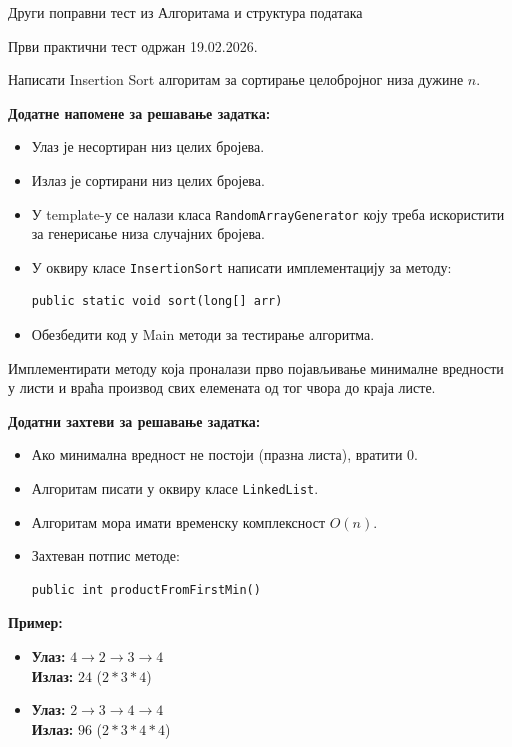 
Други поправни тест из Алгоритама и структура података

Први практични тест одржан 19.02.2026.

Написати Insertion Sort алгоритам за сортирање целобројног низа дужине $n$.

\textbf{Додатне напомене за решавање задатка:}
\begin{itemize}
	\item Улаз је несортиран низ целих бројева.
	\item Излаз је сортирани низ целих бројева.
	\item У template-у се налази класа \texttt{RandomArrayGenerator} коју треба искористити за генерисање низа случајних бројева.
	\item У оквиру класе \texttt{InsertionSort} написати имплементацију за методу:
	\begin{Verbatim}[fontsize=\small]
public static void sort(long[] arr)
	\end{Verbatim}
	\item Обезбедити код у Main методи за тестирање алгоритма.
\end{itemize}

Имплементирати методу која проналази прво појављивање минималне вредности у листи и враћа производ свих елемената од тог чвора до краја листе.

\textbf{Додатни захтеви за решавање задатка:}
\begin{itemize}
	\item Ако минимална вредност не постоји (празна листа), вратити 0.
	\item Алгоритам писати у оквиру класе \texttt{LinkedList}.
	\item Алгоритам мора имати временску комплексност $O(n)$.
	\item Захтеван потпис методе:
	\begin{Verbatim}[fontsize=\small]
public int productFromFirstMin()
	\end{Verbatim}
\end{itemize}

\textbf{Пример:}
\begin{itemize}
	\item \textbf{Улаз:} $4 \rightarrow 2 \rightarrow 3 \rightarrow 4$ \\
	      \textbf{Излаз:} $24$ ($2 * 3 * 4$)
	\item \textbf{Улаз:} $2 \rightarrow 3 \rightarrow 4 \rightarrow 4$ \\
	      \textbf{Излаз:} $96$ ($2 * 3 * 4 * 4$)
\end{itemize}

